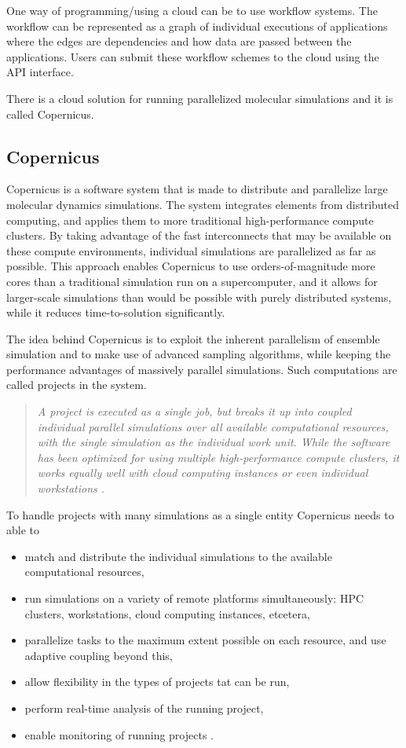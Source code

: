 One way of programming/using a cloud can be to use workflow
systems. The workflow can be represented as a graph of individual
executions of applications where the edges are dependencies and how
data are passed between the applications. Users can submit these
workflow schemes to the cloud using the API interface.

There is a cloud solution for running parallelized molecular
simulations and it is called Copernicus.


\subsection{Copernicus}
Copernicus is a software system that is made to distribute and
parallelize large molecular dynamics simulations. The system
integrates elements from distributed computing, and applies them to
more traditional high-performance compute clusters. By taking
advantage of the fast interconnects that may be available on these
compute environments, individual simulations are parallelized as far
as possible. This approach enables Copernicus to use
orders-of-magnitude more cores than a traditional simulation run on a
supercomputer, and it allows for larger-scale simulations than would
be possible with purely distributed systems, while it reduces
time-to-solution significantly.

The idea behind Copernicus is to exploit the inherent parallelism of
ensemble simulation and to make use of advanced sampling algorithms,
while keeping the performance advantages of massively parallel
simulations. Such computations are called projects in the system.

\begin{quote} \slshape
  A project is executed as a single job, but breaks it up into coupled
  individual parallel simulations over all available computational
  resources, with the single simulation as the individual work
  unit. While the software has been optimized for using multiple
  high-performance compute clusters, it works equally well with cloud
  computing instances or even individual
  workstations \citep{pronk:2011}.
\end{quote}

To handle projects with many simulations as a single entity Copernicus
needs to able to
\renewcommand{\labelitemi}{-}
\begin{itemize} \slshape
\item match and distribute the individual simulations to the available
  computational resources,
\item run simulations on a variety of remote platforms simultaneously:
  HPC clusters, workstations, cloud computing instances, etcetera,
\item parallelize tasks to the maximum extent possible on each
  resource, and use adaptive coupling beyond this,
\item allow flexibility in the types of projects tat can be run,
\item perform real-time analysis of the running project,
\item enable monitoring of running projects \citep{pronk:2011}.
\end{itemize}

